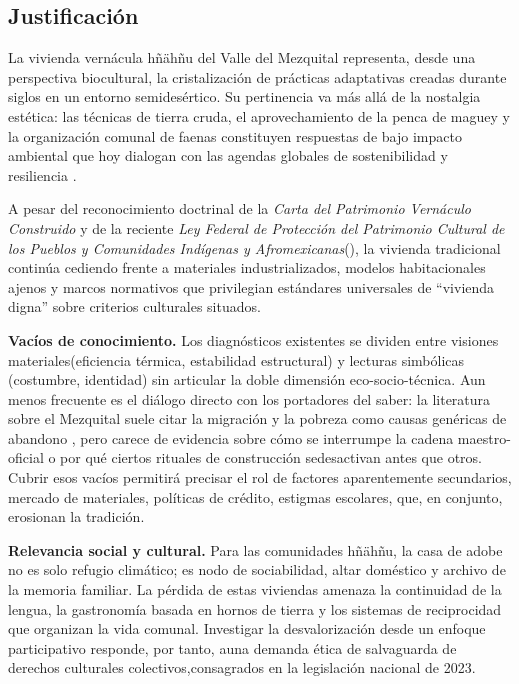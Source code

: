 \subsection{Justificación}

La vivienda vernácula hñähñu del Valle del Mezquital representa, desde una perspectiva biocultural, la cristalización de prácticas adaptativas creadas durante siglos en un entorno semidesértico. Su pertinencia va más allá de la nostalgia estética: las técnicas de tierra cruda, el aprovechamiento de la penca de maguey y la organización comunal de faenas constituyen respuestas de bajo impacto ambiental que hoy dialogan con las agendas globales de sostenibilidad y resiliencia \citep{gudynas2010desarrollo}.

A pesar del reconocimiento doctrinal de la \emph{Carta del Patrimonio Vernáculo Construido} \citep{icomos1999carta} y de la reciente \emph{Ley Federal de Protección del Patrimonio Cultural	de los Pueblos y Comunidades Indígenas y Afromexicanas}(\citeyear{ley2023patrimonio}), la vivienda tradicional continúa cediendo frente a materiales industrializados, modelos habitacionales ajenos y marcos normativos que privilegian estándares universales de ``vivienda digna'' sobre criterios culturales situados.

\textbf{Vacíos de conocimiento.}
Los diagnósticos existentes se dividen entre visiones materiales(eficiencia térmica, estabilidad estructural) y lecturas simbólicas (costumbre, identidad) sin articular la doble dimensión eco-socio-técnica. Aun menos frecuente es el diálogo directo con los portadores del saber: la literatura sobre el Mezquital suele citar la migración y la pobreza como causas genéricas de abandono \citep{alvarez2003maguey, juarez2018transformacion}, pero carece de evidencia sobre cómo se interrumpe la cadena maestro-oficial o por qué ciertos rituales de construcción sedesactivan antes que otros.  Cubrir esos vacíos permitirá precisar el rol de factores aparentemente secundarios, mercado de materiales, políticas de crédito, estigmas escolares, que, en conjunto, erosionan la tradición.

\textbf{Relevancia social y cultural.}
Para las comunidades hñähñu, la casa de adobe no es solo refugio climático; es nodo de sociabilidad, altar doméstico y archivo de la memoria familiar.  La pérdida de estas viviendas amenaza la continuidad de la lengua, la gastronomía basada en hornos de tierra y los sistemas de reciprocidad que organizan la vida comunal.  Investigar la desvalorización desde un enfoque participativo responde, por tanto, auna demanda ética de salvaguarda de derechos culturales colectivos,consagrados en la legislación nacional de 2023.

